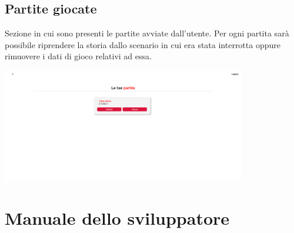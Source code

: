\documentclass{article}
\begin{document}
\newpage
\subsection*{Partite giocate}
Sezione in cui sono presenti le partite avviate dall'utente. Per ogni partita sarà possibile riprendere la storia dallo scenario in cui era stata interrotta oppure rimuovere i dati di gioco relativi ad essa.
\begin{center}
    \includegraphics[width=0.8\textwidth]{foto26.png}
\end{center}

\clearpage
\section*{Manuale dello sviluppatore}
\end{document}
